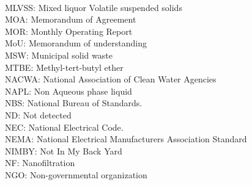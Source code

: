 \vspace{0.3cm}\\
MLVSS:  Mixed liquor Volatile suspended solids
\vspace{0.3cm}\\
MOA:  Memorandum of Agreement
\vspace{0.3cm}\\
MOR:  Monthly Operating Report
\vspace{0.3cm}\\
MoU:  Memorandum of understanding
\vspace{0.3cm}\\
MSW:  Municipal solid waste
\vspace{0.3cm}\\
MTBE:  Methyl-tert-butyl ether
\vspace{0.3cm}\\
NACWA:  National Association of Clean Water Agencies
\vspace{0.3cm}\\
NAPL:  Non Aqueous phase liquid
\vspace{0.3cm}\\
NBS:  National Bureau of Standards.
\vspace{0.3cm}\\
ND:  Not detected
\vspace{0.3cm}\\



NEC:  National Electrical Code.
\vspace{0.3cm}\\



NEMA:  National Electrical Manufacturers Association Standard
\vspace{0.3cm}\\
NIMBY:  Not In My Back Yard
\vspace{0.3cm}\\

NF:  Nanofiltration
\vspace{0.3cm}\\
NGO:  Non-governmental organization
\vspace{0.3cm}\\

